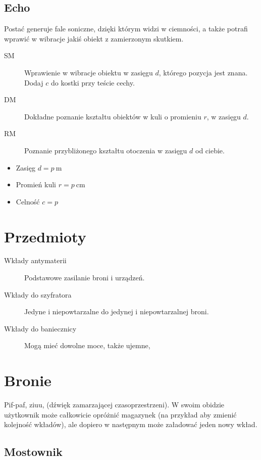\subsection{Echo}
Postać generuje fale soniczne, dzięki którym widzi w ciemności, a także potrafi wprawić w wibracje jakiś obiekt z zamierzonym skutkiem.
\begin{description}
	\item[SM] Wprawienie w wibracje obiektu w zasięgu $d$, którego pozycja jest znana. Dodaj $c$ do kostki przy teście cechy.
	\item[DM] Dokładne poznanie kształtu obiektów w kuli o promieniu $r$, w zasięgu $d$.
	\item[RM] Poznanie przybliżonego kształtu otoczenia w zasięgu $d$ od ciebie.
\end{description}
\begin{itemize}
	\item Zasięg $d = p \ \si{\meter}$
	\item Promień kuli $r = p \ \si{\centi\meter}$
	\item Celność $c = p$
\end{itemize}



\section{Przedmioty}
\begin{description}
	\item[Wkłady antymaterii] Podstawowe zasilanie broni i urządzeń.
	\item[Wkłady do szyfratora] Jedyne i niepowtarzalne do jedynej i niepowtarzalnej broni.
	\item[Wkłady do baniecznicy] Mogą mieć dowolne moce, także ujemne,
\end{description}

\section{Bronie}
Pif-paf, ziuu, (dźwięk zamarzającej czasoprzestrzeni).
W swoim obidzie użytkownik może całkowicie opróżnić magazynek (na przykład aby zmienić kolejność wkładów), ale dopiero w następnym może załadować jeden nowy wkład.

\subsection{Mostownik \abs{}}

